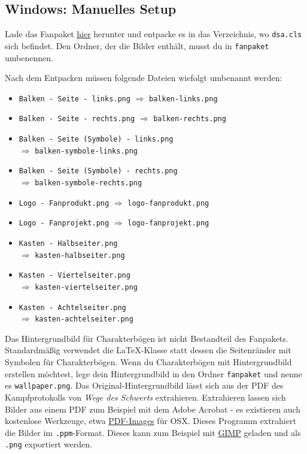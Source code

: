 \documentclass{dsa}
\begin{document}
   \begin{dsaBoxPortrait}
      \subsection*{Windows: Manuelles Setup}
      Lade das Fanpaket
      \href{http://www.ulisses-spiele.de/download/889/}{hier} herunter und
      entpacke es in das Verzeichnis, wo \texttt{dsa.cls} sich befindet. Den
      Ordner, der die Bilder enthält, musst du in \texttt{fanpaket} umbenennen.
      
      Nach dem Entpacken müssen folgende Dateien wiefolgt umbenannt werden:
      
      \scriptsize
      \begin{itemize} \itemsep0em
         \item \texttt{Balken - Seite - links.png} $\Rightarrow$ \texttt{balken-links.png}
         \item \texttt{Balken - Seite - rechts.png} $\Rightarrow$ \texttt{balken-rechts.png}
         \item \texttt{Balken - Seite (Symbole) - links.png} \\ $\Rightarrow$ \texttt{balken-symbole-links.png}
         \item \texttt{Balken - Seite (Symbole) - rechts.png} \\ $\Rightarrow$ \texttt{balken-symbole-rechts.png}
         \item \texttt{Logo - Fanprodukt.png} $\Rightarrow$ \texttt{logo-fanprodukt.png}
         \item \texttt{Logo - Fanprojekt.png} $\Rightarrow$ \texttt{logo-fanprojekt.png}
         \item \texttt{Kasten - Halbseiter.png} \\ $\Rightarrow$ \texttt{kasten-halbseiter.png}
         \item \texttt{Kasten - Viertelseiter.png} \\ $\Rightarrow$ \texttt{kasten-viertelseiter.png}
         \item \texttt{Kasten - Achtelseiter.png} \\ $\Rightarrow$ \texttt{kasten-achtelseiter.png}
      \end{itemize}
   \end{dsaBoxPortrait}
   
   Das Hintergrundbild für Charakterbögen ist nicht Bestandteil des Fanpakets.
   Standardmäßig verwendet die \LaTeX-Klasse statt dessen die Seitenränder mit
   Symbolen für Charakterbögen. Wenn du Charakterbögen mit Hintergrundbild
   erstellen möchtest, lege dein Hintergrundbild in den Ordner \texttt{fanpaket}
   und nenne es \texttt{wallpaper.png}. Das Original-Hintergrundbild lässt sich
   aus der PDF des Kampfprotokolls von \textit{Wege des Schwerts} extrahieren.
   Extrahieren lassen sich Bilder aus einem PDF zum Beispiel mit dem Adobe
   Acrobat - es existieren auch kostenlose Werkzeuge, etwa
   \href{http://sourceforge.net/projects/pdf-images/}{PDF-Images} für OSX.
   Dieses Programm extrahiert die Bilder im \texttt{.ppm}-Format. Dieses kann
   zum Beispiel mit \href{http://www.gimp.org}{GIMP} geladen und als
   \texttt{.png} exportiert werden.
   
\end{document}
